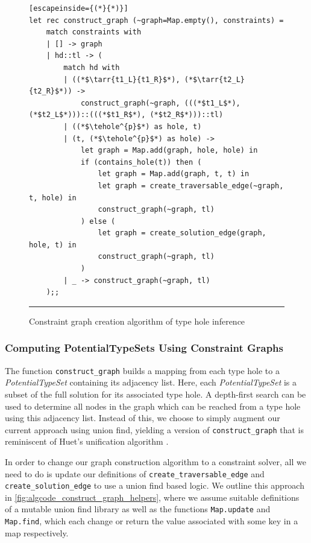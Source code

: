 \begin{figure}[hbt!]
\begin{lstlisting}[escapeinside={(*}{*)}]
let rec construct_graph (~graph=Map.empty(), constraints) =
    match constraints with
    | [] -> graph
    | hd::tl -> (
        match hd with
        | ((*$\tarr{t1_L}{t1_R}$*), (*$\tarr{t2_L}{t2_R}$*)) ->
            construct_graph(~graph, (((*$t1_L$*), (*$t2_L$*)))::(((*$t1_R$*), (*$t2_R$*)))::tl)
        | ((*$\tehole^{p}$*) as hole, t)
        | (t, (*$\tehole^{p}$*) as hole) ->
            let graph = Map.add(graph, hole, hole) in
            if (contains_hole(t)) then (
                let graph = Map.add(graph, t, t) in
                let graph = create_traversable_edge(~graph, t, hole) in
                construct_graph(~graph, tl)
            ) else (
                let graph = create_solution_edge(graph, hole, t) in
                construct_graph(~graph, tl)
            )
        | _ -> construct_graph(~graph, tl)
    );;

\end{lstlisting}
\vspace{-4px}
\hrule
\caption{Constraint graph creation algorithm of type hole inference}
\label{fig:algcode_construct_graph}
\end{figure}

\subsubsection{Computing PotentialTypeSets Using Constraint Graphs} 
The function \lstinline{construct_graph} builds a mapping from each type hole to a \emph{PotentialTypeSet} containing its adjacency list. Here, each \textit{PotentialTypeSet} is a subset of the full solution for its associated type hole. A depth-first search can be used to determine all nodes in the graph which can be reached from a type hole using this adjacency list. Instead of this, we choose to simply augment our current approach using union find, yielding a version of \lstinline{construct_graph} that is reminiscent of Huet's unification algorithm \cite{Huet}.

In order to change our graph construction algorithm to a constraint solver, all we need to do is update our definitions of \lstinline{create_traversable_edge} and \lstinline{create_solution_edge} to use a union find based logic. We outline this approach in \ref{fig:algcode_construct_graph_helpers}, where we assume suitable definitions of a mutable union find library as well as the functions \lstinline{Map.update} and \lstinline{Map.find}, which each change or return the value associated with some key in a map respectively.

